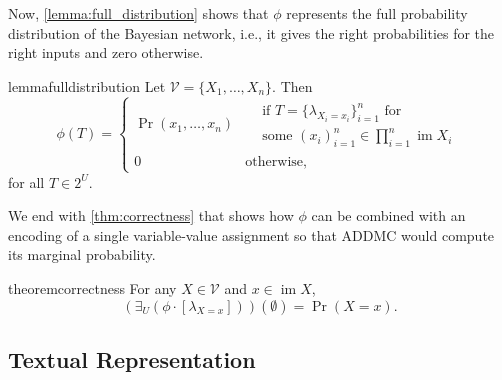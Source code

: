 \documentclass{article}
\DeclareMathOperator{\im}{im}
\begin{document}
Now, \cref{lemma:full_distribution} shows that $\phi$ represents the full
probability distribution of the Bayesian network, i.e., it gives the right
probabilities for the right inputs and zero otherwise. 

\begin{restatable}{lemma}{fulldistribution} \label{lemma:full_distribution}
  Let $\mathcal{V} = \{X_1, \dots, X_n\}$. Then
  \[
    \phi(T) =
    \begin{cases}
      \Pr(x_1, \dots, x_n) &
      \begin{aligned}
        &\text{if } T = \{ \lambda_{X_i=x_i} \}_{i = 1}^n \text{ for} \\
        &\text{some } \textstyle (x_i)_{i=1}^n \in \prod_{i=1}^n \im X_i
      \end{aligned} \\
      0 & \text{otherwise,}
    \end{cases}
  \]
  for all $T \in 2^U$.
\end{restatable}

We end with \cref{thm:correctness} that shows how $\phi$ can be combined with an
encoding of a single variable-value assignment so that ADDMC would compute its
marginal probability.

\begin{restatable}{theorem}{correctness} \label{thm:correctness}
  For any $X \in \mathcal{V}$ and $x \in \im X$,
  \[
    (\exists_U(\phi \cdot [\lambda_{X=x}]))(\emptyset) = \Pr(X = x).
  \]
\end{restatable}

\subsection{Textual Representation} \label{sec:textual_representation}
\end{document}
